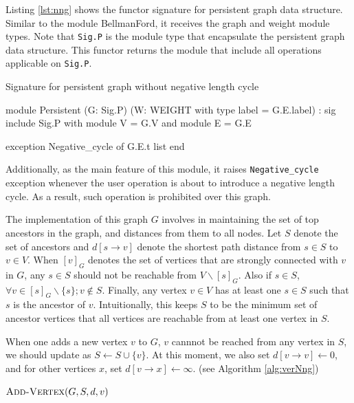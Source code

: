 \documentclass[a4paper,12pt]{article}
\begin{document}
Listing \ref{lst:nng} shows the functor signature for persistent graph
data structure. Similar to the module BellmanFord, it receives the
graph and weight module types. Note that \texttt{Sig.P} is the module
type that encapsulate the persistent graph data structure. This
functor returns the module that include all operations applicable on
\texttt{Sig.P}.

\begin{algorithm}
\caption{Signature for persistent graph without negative length cycle}\label{lst:nng}
\begin{ocaml}
module Persistent
  (G: Sig.P)
  (W: WEIGHT with type label = G.E.label) :
sig
  include Sig.P with module V = G.V and module E = G.E

  exception Negative_cycle of G.E.t list
end
\end{ocaml}
\end{algorithm}

Additionally, as the main feature of this module, it raises
\texttt{Negative\_cycle} exception whenever the user operation is
about to introduce a negative length cycle. As a result, such
operation is prohibited over this graph.

The implementation of this graph $G$ involves in maintaining the set
of top ancestors in the graph, and distances from them to all
nodes. Let $S$ denote the set of ancestors and $d[s\to v]$ denote the
shortest path distance from $s\in S$ to $v\in V$. When $[v]_G$ denotes
the set of vertices that are strongly connected with $v$ in $G$, any
$s\in S$ should not be reachable from $V\backslash[s]_G$. Also if
$s\in S$, $\forall v\in[s]_G\backslash\{s\}; v\notin S$. Finally, any
vertex $v\in V$ has at least one $s\in S$ such that $s$ is the
ancestor of $v$. Intuitionally, this keeps $S$ to be the minimum set
of ancestor vertices that all vertices are reachable from at least one
vertex in $S$.

When one adds a new vertex $v$ to $G$, $v$ cannnot be reached from any
vertex in $S$, we should update as $S\leftarrow S\cup\{v\}$. At this
moment, we also set $d[v\to v]\leftarrow 0$, and for other vertices
$x$, set $d[v\to x]\leftarrow \infty$. (see Algorithm
\ref{alg:verNng})

\setcounter{algorithm}{3}
\begin{algorithm}
\caption{$\ensuremath{\mbox{\sc Add-Vertex}}(G,S,d,v)$}\label{alg:verNng}
\begin{algorithmic}[1]
\end{algorithmic}
\end{algorithm}
\end{document}
